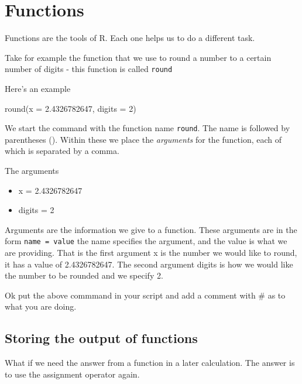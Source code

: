\documentclass[
]{book}
\newenvironment{Shaded}{\begin{snugshade}}{\end{snugshade}}
\newcommand{\AttributeTok}[1]{\textcolor[rgb]{0.77,0.63,0.00}{#1}}
\newcommand{\DecValTok}[1]{\textcolor[rgb]{0.00,0.00,0.81}{#1}}
\newcommand{\FloatTok}[1]{\textcolor[rgb]{0.00,0.00,0.81}{#1}}
\newcommand{\FunctionTok}[1]{\textcolor[rgb]{0.00,0.00,0.00}{#1}}
\newcommand{\NormalTok}[1]{#1}
\begin{document}
\hypertarget{functions}{%
\section{Functions}\label{functions}}

Functions are the tools of R. Each one helps us to do a different task.

Take for example the function that we use to round a number to a certain number of digits - this function is called \texttt{round}

Here's an example

\begin{Shaded}
\begin{Highlighting}[]
\FunctionTok{round}\NormalTok{(}\AttributeTok{x  =} \FloatTok{2.4326782647}\NormalTok{, }\AttributeTok{digits =} \DecValTok{2}\NormalTok{)}
\end{Highlighting}
\end{Shaded}

We start the command with the function name \texttt{round}. The name is followed by parentheses (). Within these we place the \emph{arguments} for the function, each of which is separated by a comma.

The arguments

\begin{itemize}
\item
  x = 2.4326782647
\item
  digits = 2
\end{itemize}

Arguments are the information we give to a function. These arguments are in the form \texttt{name\ =\ value} the name specifies the argument, and the value is what we are providing. That is the first argument x is the number we would like to round, it has a value of 2.4326782647. The second argument digits is how we would like the number to be rounded and we specify 2.

Ok put the above commmand in your script and add a comment with \# as to what you are doing.

\hypertarget{storing-the-output-of-functions}{%
\subsection{Storing the output of functions}\label{storing-the-output-of-functions}}

What if we need the answer from a function in a later calculation. The answer is to use the assignment operator again.
\end{document}
